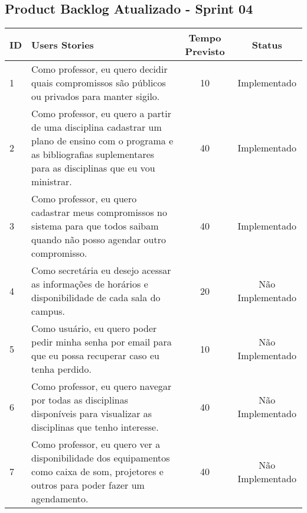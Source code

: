 \begin{landscape}
	\chapter{Product Backlog Atualizado - Sprint 04}
		\begin{longtable}{|p{0.5in}|p{6in}|c|c|}
		
		\hline
		  {\bf ID} & {\bf Users Stories} & {\bf Tempo Previsto} & {\bf Status} \\
	
		\hline \rowcolor{cImplementado}
		         1 & Como professor, eu quero decidir quais compromissos são públicos ou privados para manter sigilo. &         10 & Implementado \\
		
		\hline \rowcolor{cImplementado}
		         2 & Como professor, eu quero a partir de uma disciplina cadastrar um plano de ensino com o programa e as bibliografias suplementares para as disciplinas que eu vou ministrar. &         40 & Implementado \\
		
		\hline \rowcolor{cImplementado}
		         3 & Como professor, eu quero cadastrar meus compromissos no sistema para que todos saibam quando não posso agendar outro compromisso. &         40 & Implementado \\
		\hline \rowcolor{cNaoImplementado}
		         4 & Como secretária eu desejo acessar as informações de horários e disponibilidade de cada sala do campus.  &         20 & Não Implementado \\
		
		\hline  \rowcolor{cNaoImplementado}
		         5 & Como usuário, eu quero poder pedir minha senha por email para que eu possa recuperar caso eu tenha perdido. &         10 & Não Implementado \\
		
		\hline \rowcolor{cNaoImplementado}
		         6 & Como professor, eu quero navegar por todas as disciplinas disponíveis para visualizar as disciplinas que tenho interesse.  &         40 & Não Implementado \\
		
		\hline \rowcolor{cNaoImplementado}
		         7 & Como professor, eu quero ver a disponibilidade dos equipamentos como caixa de som, projetores e outros para poder fazer um agendamento. &         40 & Não Implementado \\
		

\end{longtable}
\end{landscape}
